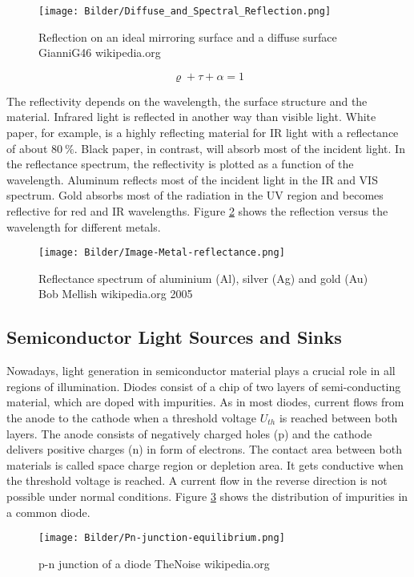 \begin{figure}[!h]
	\centering
	\texttt{[image: Bilder/Diffuse\_and\_Spectral\_Reflection.png]}
	\caption{Reflection on an ideal mirroring surface and a diffuse surface \tiny GianniG46 wikipedia.org \ccbysa }
	\label{fig:Diffuse_Reflection}
\end{figure} 

\begin{equation}
\varrho +\tau + \alpha=1
\label{eq:Optical_Energy_Convervation}
\end{equation} 
\medskip

The reflectivity depends on the wavelength, the surface structure and the material. Infrared light is reflected in another way than visible light. White paper, for example, is a highly reflecting material for IR light with a reflectance of about $80~\%$. Black paper, in contrast, will absorb most of the incident light. In the reflectance spectrum, the reflectivity is plotted as a function of the wavelength. Aluminum reflects most of the incident light in the IR and VIS spectrum. Gold absorbs most of the radiation in the UV region and becomes reflective for red and IR wavelengths. Figure \ref{fig:Reflection on different metals} shows the reflection versus the wavelength for different metals.

\begin{figure}[!h]
	\centering
	\texttt{[image: Bilder/Image-Metal-reflectance.png]}
	\caption{Reflectance spectrum of aluminium (Al), silver (Ag) and gold (Au) \tiny Bob Mellish wikipedia.org 2005 }
	\label{fig:Reflection on different metals}
\end{figure} 

\newpage
 
\subsection{Semiconductor Light Sources and Sinks}
 
Nowadays, light generation in semiconductor material plays a crucial role in all regions of illumination. Diodes consist of a chip of two layers of semi-conducting material, which are doped with impurities. As in most diodes, current flows from the anode to the cathode when a threshold voltage $U_{th}$ is reached between both layers. The anode consists of negatively charged holes (p) and the cathode delivers positive charges (n) in form of electrons. The contact area between both materials is called space charge region or depletion area. It gets conductive when the threshold voltage is reached. A current flow in the reverse direction is not possible under normal conditions. Figure \ref{fig:Pnjunction} shows the distribution of impurities in a common diode.
\begin{figure} [!h]
	\centering
	\texttt{[image: Bilder/Pn-junction-equilibrium.png]}
	\caption{p-n junction of a diode \tiny TheNoise wikipedia.org \ccbysa}
	\label{fig:Pnjunction}
\end{figure}

